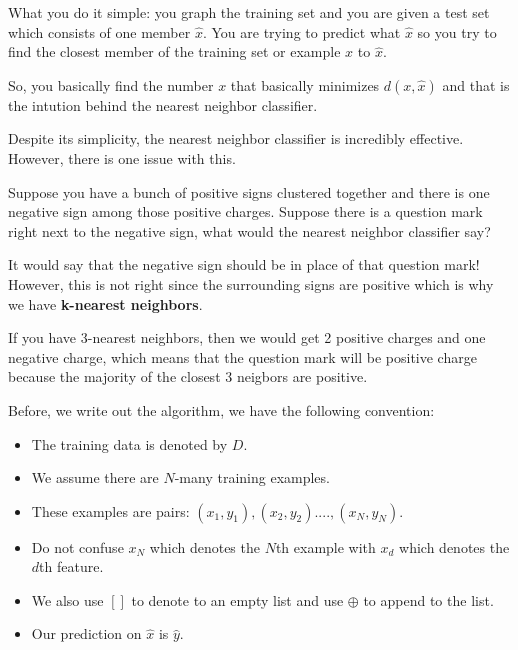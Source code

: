 \documentclass{article}
\begin{document}
\vspace{0.5cm}

What you do it simple: you graph the training set and you are given a test set which consists of one member $\hat{x}$. You are trying to predict what $\hat{x}$ so you try to find the closest member of the training set or example $x$ to $\hat{x}$.

\vspace{0.5cm}

So, you basically find the number $x$ that basically minimizes $d(x, \hat{x})$ and that is the intution behind the nearest neighbor classifier.

\vspace{0.5cm}

Despite its simplicity, the nearest neighbor classifier is incredibly effective. However, there is one issue with this. 

Suppose you have a bunch of positive signs clustered together
and there is one negative sign among those positive charges. Suppose there is a question mark right next to the negative sign, what would the nearest neighbor classifier say?

\vspace{0.5cm}

It would say that the negative sign should be in place of that question mark! However, this is not right since the surrounding signs are positive which is why we have \textbf{k-nearest neighbors}.

\vspace{0.5cm}

If you have 3-nearest neighbors, then we would get 2 positive charges and one negative charge, which means that the question mark will be positive charge because the majority of the closest 3 neigbors are positive.

\vspace{0.5cm}

Before, we write out the algorithm, we have the following convention:

\begin{itemize}
    \item The training data is denoted by $D$.
    \item We assume there are $N$-many training examples.
    \item These examples are pairs: $(x_1, y_1), (x_2,y_2)...., (x_N, y_N).$
    \item Do not confuse $x_N$ which denotes the $N$th example with $x_d$ which denotes the $d$th feature.
    \item We also use $[]$ to denote to an empty list and use $\oplus$ to append to the list.
    \item Our prediction on $\hat{x}$ is $\hat{y}$. 
\end{itemize}
\end{document}
